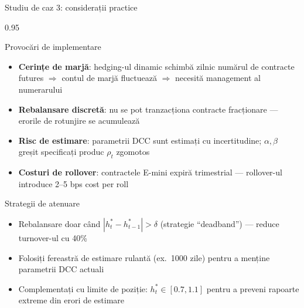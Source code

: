 \documentclass[9pt, aspectratio=169, t]{beamer}
\begin{document}
\begin{frame}{Studiu de caz 3: considerații practice}
    \begin{cminipage}{0.95\textwidth}
    {\footnotesize
    \begin{block}{Provocări de implementare}
        \begin{itemize}\setlength{\itemsep}{1pt}
            \item \textbf{Cerințe de marjă}: hedging-ul dinamic schimbă zilnic numărul de contracte futures $\Rightarrow$ contul de marjă fluctuează $\Rightarrow$ necesită management al numerarului
            \item \textbf{Rebalansare discretă}: nu se pot tranzacționa contracte fracționare --- erorile de rotunjire se acumulează
            \item \textbf{Risc de estimare}: parametrii DCC sunt estimați cu incertitudine; $\alpha, \beta$ greșit specificați produc $\rho_t$ zgomotos
            \item \textbf{Costuri de rollover}: contractele E-mini expiră trimestrial --- rollover-ul introduce 2--5 bps cost per roll
        \end{itemize}
    \end{block}
    \begin{alertblock}{Strategii de atenuare}
        \begin{itemize}\setlength{\itemsep}{0pt}
            \item Rebalansare doar când $|h_t^* - h_{t-1}^*| > \delta$ (strategie ``deadband'') --- reduce turnover-ul cu 40\%
            \item Folosiți fereastră de estimare rulantă (ex.\ 1000 zile) pentru a menține parametrii DCC actuali
            \item Complementați cu limite de poziție: $h_t^* \in [0.7, 1.1]$ pentru a preveni rapoarte extreme din erori de estimare
        \end{itemize}
    \end{alertblock}
    }
    \end{cminipage}
\end{frame}
\end{document}

